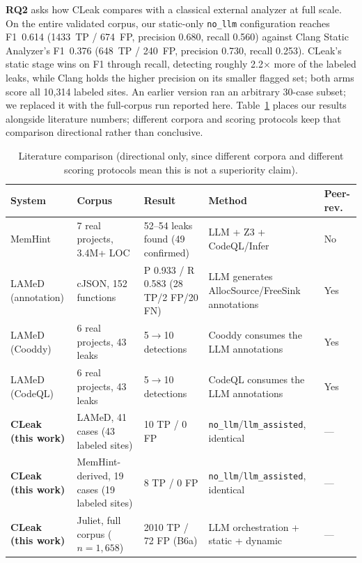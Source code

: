 \documentclass[a4paper]{llncs}
\begin{document}
\textbf{RQ2} asks how CLeak compares with a classical external analyzer
at full scale. On the entire validated corpus, our static-only
\texttt{no\_llm} configuration reaches F1~0.614 (1433~TP / 674~FP,
precision 0.680, recall 0.560) against Clang Static Analyzer's F1~0.376
(648~TP / 240~FP, precision 0.730, recall 0.253). CLeak's static stage
wins on F1 through recall, detecting roughly 2.2$\times$ more of the
labeled leaks, while Clang holds the higher precision on its smaller
flagged set; both arms score all 10{,}314 labeled sites. An earlier
version ran
an arbitrary 30-case subset; we replaced it with the full-corpus run
reported here. Table~\ref{tab:literature} places our results alongside
literature numbers; different corpora and scoring protocols keep that
comparison directional rather than conclusive.

\begin{table}[htbp]
\centering
\caption{Literature comparison (directional only, since different corpora and
different scoring protocols mean this is not a superiority claim).}
\label{tab:literature}
\footnotesize
\begin{tabular}{@{}p{2.1cm}p{3.6cm}p{3.7cm}p{2.4cm}p{1.3cm}@{}}
\toprule
\textbf{System} & \textbf{Corpus} & \textbf{Result} & \textbf{Method} & \textbf{Peer-rev.} \\
\midrule
MemHint~\cite{memhint} & 7 real projects, 3.4M+ LOC & 52--54 leaks found (49 confirmed) & LLM + Z3 + CodeQL/Infer & No \\
LAMeD~\cite{lamed} (annotation) & cJSON, 152 functions & P 0.933 / R 0.583 (28 TP/2 FP/20 FN) & LLM generates AllocSource/FreeSink annotations & Yes \\
LAMeD~\cite{lamed} (Cooddy) & 6 real projects, 43 leaks & 5$\to$10 detections & Cooddy consumes the LLM annotations & Yes \\
LAMeD~\cite{lamed} (CodeQL) & 6 real projects, 43 leaks & 5$\to$10 detections & CodeQL consumes the LLM annotations & Yes \\
\textbf{CLeak (this work)} & LAMeD, 41 cases (43 labeled sites) & 10 TP / 0 FP & \texttt{no\_llm}/\texttt{llm\_assisted}, identical & --- \\
\textbf{CLeak (this work)} & MemHint-derived, 19 cases (19 labeled sites) & 8 TP / 0 FP & \texttt{no\_llm}/\texttt{llm\_assisted}, identical & --- \\
\textbf{CLeak (this work)} & Juliet, full corpus ($n{=}1{,}658$) & 2010 TP / 72 FP (B6a) & LLM orchestration + static + dynamic & --- \\
\bottomrule
\end{tabular}
\end{table}
\end{document}
